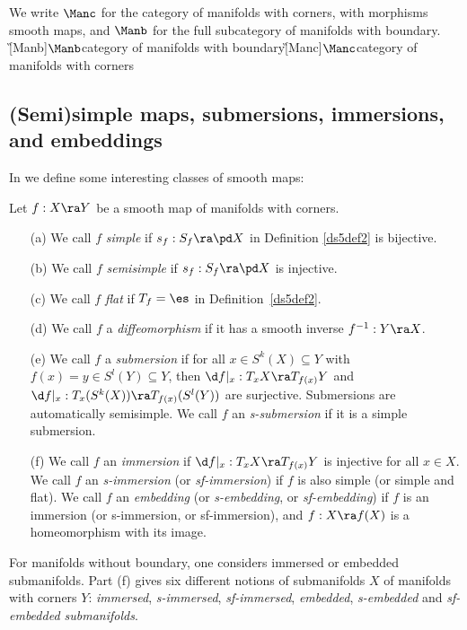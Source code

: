 \documentclass{article}
\begin{document}
We write $\Manc$ for the category of manifolds with corners, with
morphisms smooth maps, and $\Manb$ for the full subcategory of
manifolds with boundary.\G[Manb]{$\Manb$}{category of manifolds with
boundary}\G[Manc]{$\Manc$}{category of manifolds with corners}

\subsection[(Semi)simple maps, submersions, immersions,
embeddings]{(Semi)simple maps, submersions, immersions, \\ and
embeddings}
\label{ds52}
  
 
 
 

In \cite[\S 5.4 \& \S 5.7]{Joyc6} we define some interesting classes
of smooth maps:

\begin{dfn} Let $f:X\ra Y$ be a smooth map of manifolds with
corners.
\begin{itemize}
\setlength{\itemsep}{0pt}
\setlength{\parsep}{0pt}
\item[(a)] We call $f$ {\it simple\/} if $s_f:S_f\ra\pd X$ in
Definition \ref{ds5def2} is bijective.
\item[(b)] We call $f$ {\it semisimple\/} if $s_f:S_f\ra\pd X$ is
injective.
\item[(c)] We call $f$ {\it flat\/} if $T_f=\es$ in
Definition~\ref{ds5def2}.
\item[(d)] We call $f$ a {\it diffeomorphism\/} if it has a
smooth inverse $f^{-1}:Y\ra X$.
\item[(e)] We call $f$ a {\it submersion\/} if for all $x\in
S^k(X)\subseteq Y$ with $f(x)=y\in S^l(Y)\subseteq Y$, then $\d
f\vert_x:T_xX\ra T_{f(x)}Y$ and $\d f\vert_x:T_x(S^k(X))\ra
T_{f(x)}(S^l(Y))$ are surjective. Submersions are automatically
semisimple. We call $f$ an {\it s-submersion\/} if it is a
simple submersion.
\item[(f)] We call $f$ an {\it immersion\/} if $\d f\vert_x:
T_xX\ra T_{f(x)}Y$ is injective for all $x\in X$. We call $f$ an
{\it s-immersion} (or {\it sf-immersion}) if $f$ is also simple
(or simple and flat). We call $f$ an {\it embedding\/} (or {\it
s-embedding}, or {\it sf-embedding\/}) if $f$ is an immersion
(or s-immersion, or sf-immersion), and $f:X\ra f(X)$ is a
homeomorphism with its image.
\end{itemize}
For manifolds without boundary, one considers immersed or embedded
submanifolds. Part (f) gives six different notions of submanifolds
$X$ of manifolds with corners $Y$: {\it immersed}, {\it s-immersed},
{\it sf-immersed}, {\it embedded}, {\it s-embedded\/} and {\it
sf-embedded submanifolds}.
\label{ds5def3}
\end{dfn}
\end{document}
